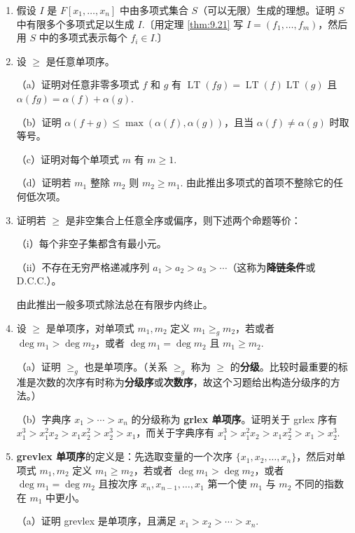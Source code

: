 \begin{enumerate}
\item 假设 \(I\) 是 \(F[x_1, \ldots, x_n]\) 中由多项式集合 \(S\)（可以无限）生成的理想。证明 \(S\) 中有限多个多项式足以生成 \(I\).〔用定理 \ref{thm:9.21} 写 \(I = (f_1, \ldots, f_m)\)，然后用 \(S\) 中的多项式表示每个 \(f_i \in I\).〕

\item 设 \(\geq\) 是任意单项序。

（a）证明对任意非零多项式 \(f\) 和 \(g\) 有 \(\operatorname{LT}(fg) = \operatorname{LT}(f)\operatorname{LT}(g)\) 且 \(\alpha(fg) = \alpha(f)+\alpha(g)\).

（b）证明 \(\alpha(f+g) \leq \max(\alpha(f), \alpha(g))\)，且当 \(\alpha(f) \neq \alpha(g)\) 时取等号。

（c）证明对每个单项式 \(m\) 有 \(m \geq 1\).

（d）证明若 \(m_1\) 整除 \(m_2\) 则 \(m_2 \geq m_1\). 由此推出多项式的首项不整除它的任何低次项。

\item 证明若 \(\geq\) 是非空集合上任意全序或偏序，则下述两个命题等价：

（i）每个非空子集都含有最小元。

（ii）不存在无穷严格递减序列 \(a_1 > a_2 > a_3 > \cdots\)（这称为\textbf{降链条件}或 D.C.C.）。

由此推出一般多项式除法总在有限步内终止。

\item 设 \(\geq\) 是单项序，对单项式 \(m_1, m_2\) 定义 \(m_1 \geq_g m_2\)，若或者 \(\deg m_1 > \deg m_2\)，或者 \(\deg m_1 = \deg m_2\) 且 \(m_1 \geq m_2\).

（a）证明 \(\geq_g\) 也是单项序。（关系 \(\geq_g\) 称为 \(\geq\) 的\textbf{分级}。比较时最重要的标准是次数的次序有时称为\textbf{分级序}或\textbf{次数序}，故这个习题给出构造分级序的方法。）

（b）字典序 \(x_1 > \cdots > x_n\) 的分级称为 \textbf{grlex 单项序}。证明关于 grlex 序有 \(x_1^3 > x_1^2x_2 > x_1x_2^2 > x_2^3 > x_1\)，而关于字典序有 \(x_1^3 > x_1^2x_2 > x_1x_2^2 > x_1 > x_2^3\).

\item \textbf{grevlex 单项序}的定义是：先选取变量的一个次序 \(\{x_1, x_2, \ldots, x_n\}\)，然后对单项式 \(m_1, m_2\) 定义 \(m_1 \geq m_2\)，若或者 \(\deg m_1 > \deg m_2\)，或者 \(\deg m_1 = \deg m_2\) 且按次序 \(x_n, x_{n-1}, \ldots, x_1\) 第一个使 \(m_1\) 与 \(m_2\) 不同的指数在 \(m_1\) 中更小。

（a）证明 grevlex 是单项序，且满足 \(x_1 > x_2 > \cdots > x_n\).


\end{enumerate}
